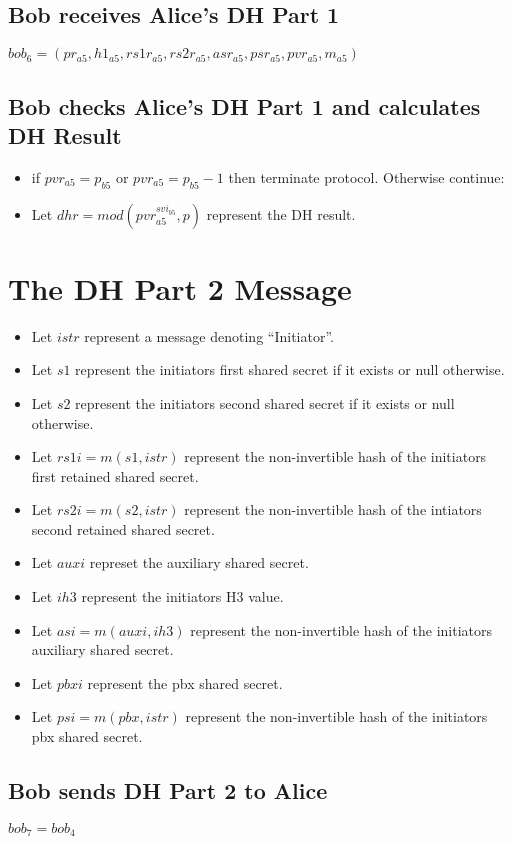 \documentclass[11pt]{article}
\begin{document}
  \subsection*{Bob receives Alice's DH Part 1}
  $bob_6=(pr_{a5},h1_{a5},rs1r_{a5},rs2r_{a5},asr_{a5},psr_{a5},
           pvr_{a5},m_{a5})$
  \subsection*{Bob checks Alice's DH Part 1 and calculates DH 
               Result}
  \begin{itemize}
    \item if $pvr_{a5} = p_{b5}$ or $pvr_{a5} = p_{b5} - 1$ then 
          terminate protocol. Otherwise continue:
    \item Let $dhr = mod(pvr_{a5}^{svi_{b5}},p)$ represent the 
          DH result.
  \end{itemize}
  \section*{The DH Part 2 Message}
  \begin{itemize}
    \item Let $istr$ represent a message denoting ``Initiator''.
    \item Let $s1$ represent the initiators first shared secret if
          it exists or null otherwise.
    \item Let $s2$ represent the initiators second shared secret if
          it exists or null otherwise.
    \item Let $rs1i = m(s1,istr)$ represent the non-invertible hash 
          of the initiators first retained shared secret.
    \item Let $rs2i = m(s2,istr)$ represent the non-invertible hash
          of the intiators second retained shared secret.
    \item Let $auxi$ represet the auxiliary shared secret.
    \item Let $ih3$ represent the initiators H3 value.
    \item Let $asi = m(auxi,ih3)$ represent the non-invertible hash
          of the initiators auxiliary shared secret.
    \item Let $pbxi$ represent the pbx shared secret.
    \item Let $psi = m(pbx,istr)$ represent the non-invertible
          hash of the initiators pbx shared secret.
  \end{itemize}
  \subsection{Bob sends DH Part 2 to Alice}
  $bob_7 = bob_4$
\end{document}
